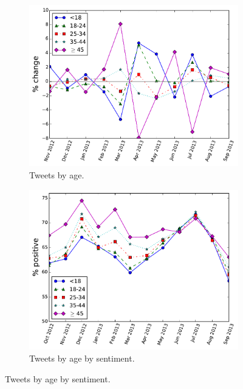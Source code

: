 \documentclass{sig-alternate}
\begin{document}
\begin{figure}[t]
  \caption{Tweets by age and sentiment.}
  \begin{subfigure}{\columnwidth}
    \centering
    \caption{Tweets by age. \label{f.age}}
    \includegraphics[width=\columnwidth]{nb/ages.pdf}
  \end{subfigure}
  \begin{subfigure}{\columnwidth}
    \centering
    \caption{Tweets by age by sentiment.\label{f.age.sentiment}}
    \includegraphics[width=\columnwidth]{nb/age_sentiment.pdf}
  \end{subfigure}
\end{figure}
\end{document}
